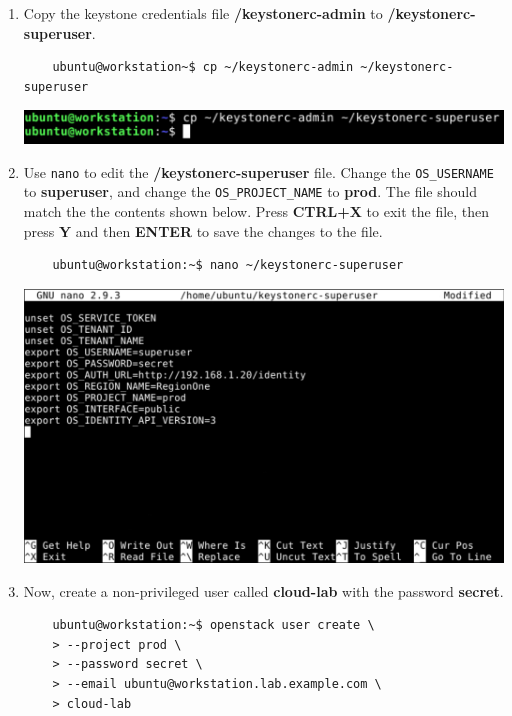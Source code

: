 \documentclass[letterpaper, 12pt]{article}
\begin{document}
\begin{enumerate}
    \item Copy the keystone credentials file \textbf{\texttildemid/keystonerc-admin} to
    \textbf{\texttildemid/keystonerc-superuser}.
    \begin{lstlisting}
    ubuntu@workstation~$ cp ~/keystonerc-admin ~/keystonerc-superuser
    \end{lstlisting}

    \begin{center}
        \includegraphics[width=\linewidth]{images/part1/step7.png}
    \end{center}

    \item Use \texttt{nano} to edit the \textbf{\texttildemid/keystonerc-superuser} file. Change the
    \texttt{OS\_USERNAME} to \textbf{superuser}, and change the \texttt{OS\_PROJECT\_NAME} to \textbf{prod}. The file
    should match the the contents shown below. Press \textbf{CTRL+X} to exit the file, then press \textbf{Y} and then
    \textbf{ENTER} to save the changes to the file.
    \begin{lstlisting}
    ubuntu@workstation:~$ nano ~/keystonerc-superuser
    \end{lstlisting}    

    \begin{center}
        \includegraphics[width=\linewidth]{images/part1/step8.png}
    \end{center}

    \item Now, create a non-privileged user called \textbf{cloud-lab} with the password \textbf{secret}.
    \begin{lstlisting}
    ubuntu@workstation:~$ openstack user create \
    > --project prod \
    > --password secret \
    > --email ubuntu@workstation.lab.example.com \
    > cloud-lab
    \end{lstlisting}


\end{enumerate}
\end{document}
